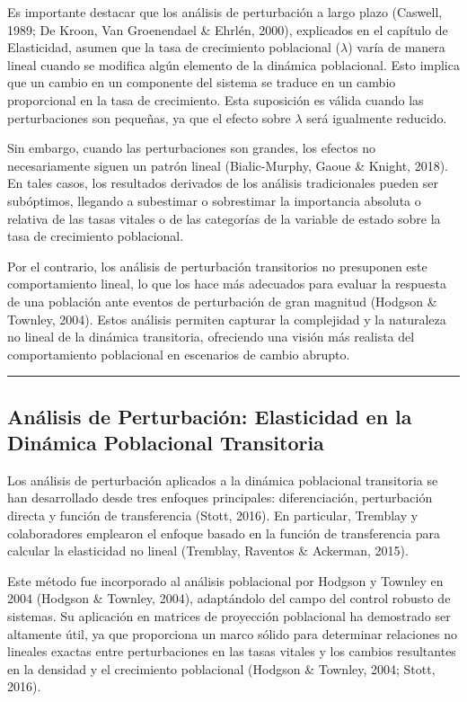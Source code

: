 \documentclass[
  12pt,
  letterpaper,
]{book}
\begin{document}
Es importante destacar que los análisis de perturbación a largo plazo
(Caswell, 1989; De Kroon, Van Groenendael \& Ehrlén, 2000), explicados
en el capítulo de Elasticidad, asumen que la tasa de crecimiento
poblacional (\(\lambda\)) varía de manera lineal cuando se modifica
algún elemento de la dinámica poblacional. Esto implica que un cambio en
un componente del sistema se traduce en un cambio proporcional en la
tasa de crecimiento. Esta suposición es válida cuando las perturbaciones
son pequeñas, ya que el efecto sobre \(\lambda\) será igualmente
reducido.

Sin embargo, cuando las perturbaciones son grandes, los efectos no
necesariamente siguen un patrón lineal (Bialic-Murphy, Gaoue \& Knight,
2018). En tales casos, los resultados derivados de los análisis
tradicionales pueden ser subóptimos, llegando a subestimar o sobrestimar
la importancia absoluta o relativa de las tasas vitales o de las
categorías de la variable de estado sobre la tasa de crecimiento
poblacional.

Por el contrario, los análisis de perturbación transitorios no
presuponen este comportamiento lineal, lo que los hace más adecuados
para evaluar la respuesta de una población ante eventos de perturbación
de gran magnitud (Hodgson \& Townley, 2004). Estos análisis permiten
capturar la complejidad y la naturaleza no lineal de la dinámica
transitoria, ofreciendo una visión más realista del comportamiento
poblacional en escenarios de cambio abrupto.

\begin{center}\rule{0.5\linewidth}{0.5pt}\end{center}

\subsection{Análisis de Perturbación: Elasticidad en la Dinámica
Poblacional
Transitoria}\label{anuxe1lisis-de-perturbaciuxf3n-elasticidad-en-la-dinuxe1mica-poblacional-transitoria}

Los análisis de perturbación aplicados a la dinámica poblacional
transitoria se han desarrollado desde tres enfoques principales:
diferenciación, perturbación directa y función de transferencia (Stott,
2016). En particular, Tremblay y colaboradores emplearon el enfoque
basado en la función de transferencia para calcular la elasticidad no
lineal (Tremblay, Raventos \& Ackerman, 2015).

Este método fue incorporado al análisis poblacional por Hodgson y
Townley en 2004 (Hodgson \& Townley, 2004), adaptándolo del campo del
control robusto de sistemas. Su aplicación en matrices de proyección
poblacional ha demostrado ser altamente útil, ya que proporciona un
marco sólido para determinar relaciones no lineales exactas entre
perturbaciones en las tasas vitales y los cambios resultantes en la
densidad y el crecimiento poblacional (Hodgson \& Townley, 2004; Stott,
2016).
\end{document}
